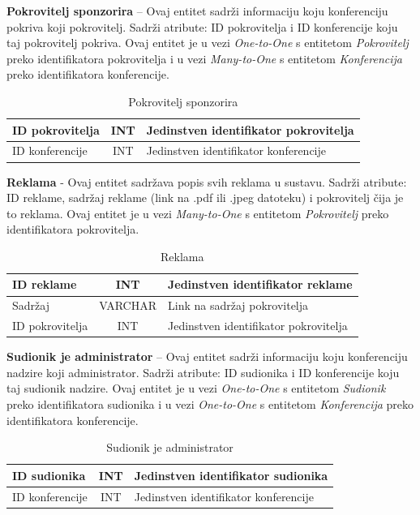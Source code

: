 \textbf{Pokrovitelj sponzorira} – Ovaj entitet sadrži informaciju koju konferenciju pokriva koji pokrovitelj. Sadrži atribute: ID pokrovitelja i ID konferencije koju taj pokrovitelj pokriva. Ovaj entitet je u vezi \textit{One-to-One} s entitetom \textit{Pokrovitelj} preko identifikatora pokrovitelja i u vezi \textit{Many-to-One} s entitetom \textit{Konferencija} preko identifikatora konferencije.

\begin{table}[H]
	\caption{Pokrovitelj sponzorira}
	\label{tbl:pokroviteljSponzorira}
	\centering
	\begin{tabular}{|l|c|l|} 
		\hline
		\cellcolor{lightblue}ID pokrovitelja & INT & Jedinstven identifikator pokrovitelja\\ 
		\hline
		\cellcolor{lightblue}ID konferencije & INT & Jedinstven identifikator konferencije\\ 
		\hline
	\end{tabular}
\end{table}

\textbf{Reklama} - Ovaj entitet sadržava popis svih reklama u sustavu. Sadrži atribute: ID reklame, sadržaj reklame (link na .pdf ili .jpeg datoteku) i pokrovitelj čija je to reklama. Ovaj entitet je u vezi \textit{Many-to-One} s entitetom \textit{Pokrovitelj} preko identifikatora pokrovitelja.

\begin{table}[H]
	\caption{Reklama}
	\label{tbl:reklama}
	\centering
	\begin{tabular}{|l|c|l|} 
		\hline
		\cellcolor{lightgreen}ID reklame & INT & Jedinstven identifikator reklame\\ 
		\hline
		Sadržaj & VARCHAR & Link na sadržaj pokrovitelja\\ 
		\hline
		\cellcolor{lightblue}ID pokrovitelja & INT & Jedinstven identifikator pokrovitelja\\ 
		\hline
	\end{tabular}
\end{table}

\textbf{Sudionik je administrator} – Ovaj entitet sadrži informaciju koju konferenciju nadzire koji administrator. Sadrži atribute: ID sudionika i ID konferencije koju taj sudionik nadzire. Ovaj entitet je u vezi \textit{One-to-One} s entitetom \textit{Sudionik} preko identifikatora sudionika i u vezi \textit{One-to-One} s entitetom \textit{Konferencija} preko identifikatora konferencije.

\begin{table}[H]
	\caption{Sudionik je administrator}
	\label{tbl:sudionikJeAdministrator}
	\centering
	\begin{tabular}{|l|c|l|} 
		\hline
		\cellcolor{lightblue}ID sudionika & INT & Jedinstven identifikator sudionika\\ 
		\hline
		\cellcolor{lightblue}ID konferencije & INT & Jedinstven identifikator konferencije\\ 
		\hline
	\end{tabular}
\end{table}


